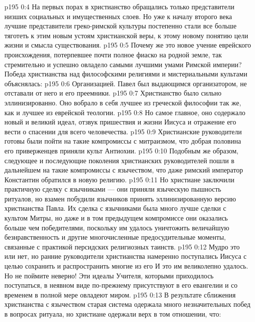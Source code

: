 \vs p195 0:4 \pc На первых порах в христианство обращались только представители низших социальных и имущественных слоев. Но уже к началу второго века лучшие представители греко\hyp{}римской культуры постепенно стали все больше тяготеть к этим новым устоям христианской веры, к этому новому понятию цели жизни и смысла существования.
\vs p195 0:5 Почему же это новое учение еврейского происхождения, потерпевшее почти полное фиаско на родной земле, так стремительно и успешно овладело самыми лучшими умами Римской империи? Победа христианства над философскими религиями и мистериальными культами объяснялась:
\vs p195 0:6 \bibnobreakspace Организацией. Павел был выдающимся организатором, не отставали от него и его преемники.
\vs p195 0:7 \pc {}\bibnobreakspace Христианство было сильно эллинизированно. Оно вобрало в себя лучшее из греческой философии так же, как и лучшее из еврейской теологии.
\vs p195 0:8 \pc {}\bibnobreakspace Но самое главное, оно содержало новый и великий идеал, отзвук пришествия и жизни Иисуса и отражение его вести о спасении для всего человечества.
\vs p195 0:9 \pc {}\bibnobreakspace Христианские руководители готовы были пойти на такие компромиссы с митраизмом, что добрая половина его приверженцев приняли культ Антиохии.
\vs p195 0:10 \pc {}\bibnobreakspace Подобным же образом, следующее и последующие поколения христианских руководителей пошли в дальнейшем на такие компромиссы с язычеством, что даже римский император Константин обратился в новую религию.
\vs p195 0:11 \pc Но христиане заключили практичную сделку с язычниками --- они приняли языческую пышность ритуалов, но взамен побудили язычников принять эллинизированную версию христианства Павла. Их сделка с язычниками была много лучше сделки с культом Митры, но даже и в том предыдущем компромиссе они оказались больше чем победителями, поскольку им удалось уничтожить величайшую безнравственность и другие многочисленные предосудительные моменты, связанные с практикой персидских религиозных таинств.
\vs p195 0:12 Мудро это или нет, но ранние руководители христианства намеренно поступались  Иисуса с целью сохранить и распространить многие из его  И это им великолепно удалось. Но не поймите неверно! Эти идеалы Учителя, которыми приходилось поступаться, в неявном виде по\hyp{}прежнему присутствуют в его евангелии и со временем в полной мере овладеют миром.
\vs p195 0:13 В результате сближения христианства с язычеством старая система одержала много незначительных побед в вопросах ритуала, но христиане одержали верх в том отношении, что:
